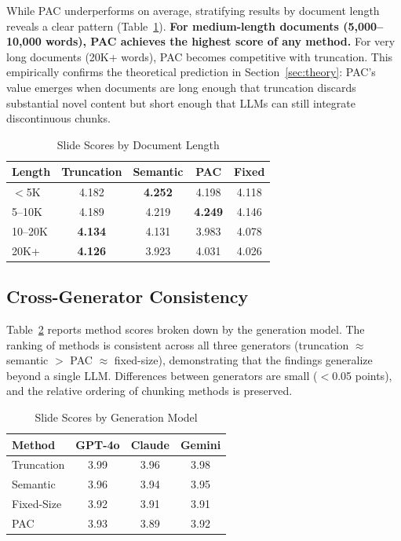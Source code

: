 \documentclass[journal]{IEEEtran}
\begin{document}
While PAC underperforms on average, stratifying results by document length reveals a clear pattern (Table~\ref{tab:slides_length}). \textbf{For medium-length documents (5{,}000--10{,}000 words), PAC achieves the highest score of any method.} For very long documents (20K+ words), PAC becomes competitive with truncation. This empirically confirms the theoretical prediction in Section~\ref{sec:theory}: PAC's value emerges when documents are long enough that truncation discards substantial novel content but short enough that LLMs can still integrate discontinuous chunks.

\begin{table}[h]
\centering
\caption{Slide Scores by Document Length}
\label{tab:slides_length}
\footnotesize
\begin{tabular}{lcccc}
\toprule
\textbf{Length} & \textbf{Truncation} & \textbf{Semantic} & \textbf{PAC} & \textbf{Fixed} \\
\midrule
$<$5K & 4.182 & \textbf{4.252} & 4.198 & 4.118 \\
5--10K & 4.189 & 4.219 & \textbf{4.249} & 4.146 \\
10--20K & \textbf{4.134} & 4.131 & 3.983 & 4.078 \\
20K+ & \textbf{4.126} & 3.923 & 4.031 & 4.026 \\
\bottomrule
\end{tabular}
\end{table}

\subsection{Cross-Generator Consistency}

Table~\ref{tab:slides_gen} reports method scores broken down by the generation model. The ranking of methods is consistent across all three generators (truncation $\approx$ semantic $>$ PAC $\approx$ fixed-size), demonstrating that the findings generalize beyond a single LLM. Differences between generators are small ($<$0.05 points), and the relative ordering of chunking methods is preserved.

\begin{table}[h]
\centering
\caption{Slide Scores by Generation Model}
\label{tab:slides_gen}
\footnotesize
\begin{tabular}{lccc}
\toprule
\textbf{Method} & \textbf{GPT-4o} & \textbf{Claude} & \textbf{Gemini} \\
\midrule
Truncation & 3.99 & 3.96 & 3.98 \\
Semantic & 3.96 & 3.94 & 3.95 \\
Fixed-Size & 3.92 & 3.91 & 3.91 \\
PAC & 3.93 & 3.89 & 3.92 \\
\bottomrule
\end{tabular}
\end{table}
\end{document}
